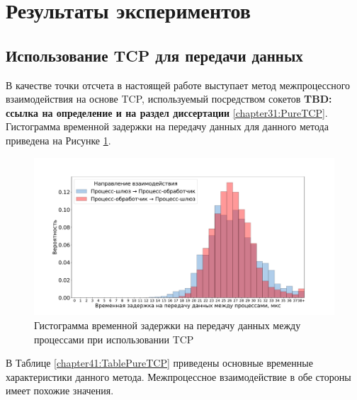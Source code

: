 \section{Результаты экспериментов}

\subsection{Использование TCP для передачи данных}

В качестве точки отсчета в настоящей работе выступает метод межпроцессного взаимодействия на основе TCP, используемый посредством сокетов \textbf{TBD: ссылка на определение и на раздел диссертации} \ref{chapter31:PureTCP}. Гистограмма временной задержки на передачу данных для данного метода приведена на Рисунке \ref{chapter41:FigPureTCP}.

\begin{figure}[!h]
\caption{Гистограмма временной задержки на передачу данных между процессами при использовании TCP}
\label{chapter41:FigPureTCP}
\includegraphics[width=\textwidth]{../../graphics/hist/PureTCP}
\end{figure}

В Таблице \ref{chapter41:TablePureTCP} приведены основные временные характеристики данного метода. Межпроцессное взаимодействие в обе стороны имеет похожие значения.

